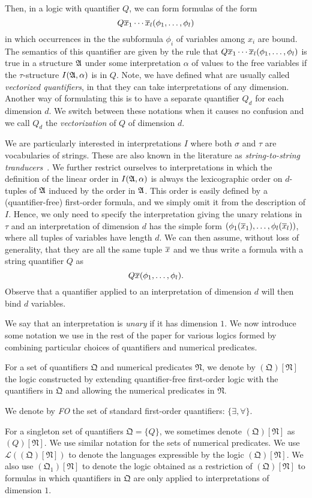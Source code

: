 \documentclass[a4paper,UKenglish,cleveref, autoref, thm-restate, anonymous]{lipics-v2021}
\begin{document}
Then, in a logic with quantifier $Q$, we can form formulas of the form
$$Q \overline{x}_1\cdots \overline{x}_l (\phi_1,\ldots,\phi_l)$$
in which occurrences in the the subformula $\phi_i$  of variables among $x_i$ are bound.  The semantics of this quantifier are given by the rule that 
$Q \overline{x}_1\cdots \overline{x}_l (\phi_1,\ldots,\phi_l)$ is true in a structure $\mathfrak{A}$ under some interpretation $\alpha$ of values to the free variables if the $\tau$-structure $I(\mathfrak{A},\alpha)$ is in $Q$.  Note, we have defined what are usually called \emph{vectorized quantifiers}, in that they can take interpretations of any dimension.  Another way of formulating this is to have a separate quantifier $Q_d$ for each dimension $d$.  We switch between these notations when it causes no confusion and we call $Q_d$ the \emph{vectorization} of $Q$ of dimension $d$.


We are particularly interested in interpretations $I$ where both $\sigma$ and $\tau$ are vocabularies of strings.  These are also known in the literature as \emph{string-to-string tranducers}~\cite{CITE3}.    We further restrict ourselves to interpretations in which the definition of the linear order in $I(\mathfrak{A},\alpha)$ is always the lexicographic order on $d$-tuples of $\mathfrak{A}$ induced by the order in $\mathfrak{A}$.  This order is easily defined by a (quantifier-free) first-order formula, and we simply omit it from the description of $I$.  Hence, we only need to specify the interpretation giving the unary relations in $\tau$ and an interpretation of dimension $d$ has the simple form $(\phi_1(\overline{x}_1),\ldots, \phi_l(\overline{x}_l))$, where all tuples of variables have length $d$.  We can then assume, without loss of generality, that they are all the same tuple $\overline{x}$ and we thus write a formula with a string quantifier $Q$ as
$$Q \overline{x} (\phi_1,\ldots,\phi_l).$$
Observe that a quantifier applied to an interpretation of dimension $d$ will then bind $d$ variables.

We say that an interpretation is \emph{unary} if it has dimension $1$.  We now introduce some notation we use in the rest of the paper for various logics formed by combining particular choices of quantifiers and numerical predicates.
\begin{definition}
  For a set of quantifiers $\mathfrak{Q}$ and numerical predicates $\mathfrak{N}$, we denote by $(\mathfrak{Q})[\mathfrak{N}]$ the logic constructed by extending quantifier-free first-order logic with the quantifiers in $\mathfrak{Q}$ and allowing the numerical predicates in $\mathfrak{N}$.

   We denote by \emph{FO} the set of standard first-order quantifiers: $\{\exists, \forall\}$.
\end{definition}
For a singleton set of quantifiers $\mathfrak{Q} = \{Q\}$, we sometimes denote $(\mathfrak{Q})[\mathfrak{N}]$ as $(Q)[\mathfrak{N}]$. We use similar notation for the sets of numerical predicates. We use $\mathcal{L}((\mathfrak{Q})[\mathfrak{N}])$ to denote the languages expressible by the logic $(\mathfrak{Q})[\mathfrak{N}]$.  We also use $(\mathfrak{Q}_1)[\mathfrak{N}]$ to denote the logic obtained as a restriction of $(\mathfrak{Q})[\mathfrak{N}]$ to formulas in which quantifiers in $\mathfrak{Q}$ are only applied to interpretations of dimension $1$.
\end{document}
